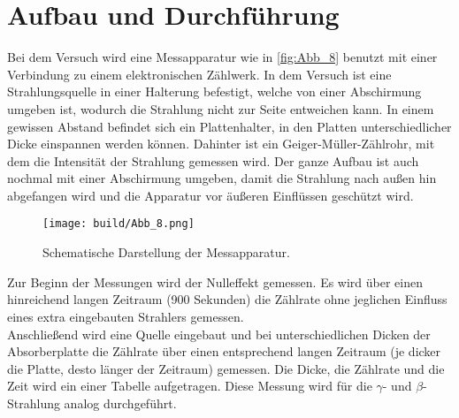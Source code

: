 \section{Aufbau und Durchführung}
\label{sec:Durchführung}
Bei dem Versuch wird eine Messapparatur wie in \autoref{fig:Abb_8} benutzt mit einer Verbindung zu einem elektronischen Zählwerk.
In dem Versuch ist eine Strahlungsquelle in einer Halterung befestigt, welche von einer Abschirmung umgeben ist, wodurch die Strahlung nicht zur Seite entweichen kann.
In einem gewissen Abstand befindet sich ein Plattenhalter, in den Platten unterschiedlicher Dicke einspannen werden können.
Dahinter ist ein Geiger-Müller-Zählrohr, mit dem die Intensität der Strahlung gemessen wird. 
Der ganze Aufbau ist auch nochmal mit einer Abschirmung umgeben, damit die Strahlung nach außen hin abgefangen wird und die Apparatur
vor äußeren Einflüssen geschützt wird.
\begin{figure}[H]
    \centering
    \texttt{[image: build/Abb\_8.png]}
    \caption {Schematische Darstellung der Messapparatur\cite[243]{V704}.}
    \label{fig:Abb_8}
\end{figure}
Zur Beginn der Messungen wird der Nulleffekt gemessen. 
Es wird über einen hinreichend langen Zeitraum (900 Sekunden) die Zählrate ohne jeglichen Einfluss eines extra eingebauten Strahlers gemessen.\\
Anschließend wird eine Quelle eingebaut und bei unterschiedlichen Dicken der Absorberplatte die Zählrate über einen entsprechend langen Zeitraum (je dicker die
Platte, desto länger der Zeitraum) gemessen.
Die Dicke, die Zählrate und die Zeit wird ein einer Tabelle aufgetragen.
Diese Messung wird für die $\gamma$- und $\beta$-Strahlung analog durchgeführt.
